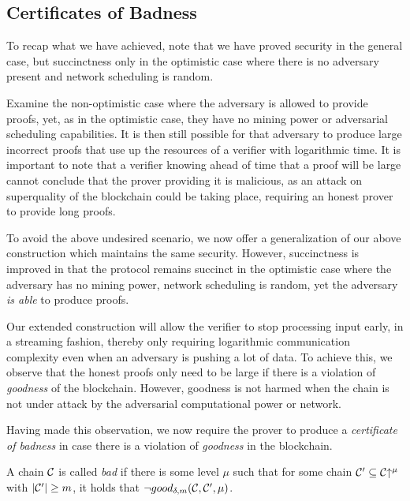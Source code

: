 \subsection{Certificates of Badness}
To recap what we have achieved, note that we have proved security in the general
case, but succinctness only in the optimistic case where there is no adversary
present and network scheduling is random.

Examine the non-optimistic case where the adversary is allowed to provide
proofs, yet, as in the optimistic case, they have no mining power or adversarial
scheduling capabilities. It is then still possible for that adversary to produce
large incorrect proofs that use up the resources of a verifier with logarithmic
time. It is important to note that a verifier knowing ahead of time that a proof
will be large cannot conclude that the prover providing it is malicious, as an
attack on superquality of the blockchain could be taking place, requiring an
honest prover to provide long proofs.

To avoid the above undesired scenario, we now offer a generalization of our
above construction which maintains the same security. However, succinctness is
improved in that the protocol remains succinct in the optimistic case where the
adversary has no mining power, network scheduling is random, yet the adversary
\textit{is able} to produce proofs.

Our extended construction will allow the verifier to stop processing input
early, in a streaming fashion, thereby only requiring logarithmic communication
complexity even when an adversary is pushing a lot of data. To achieve this, we
observe that the honest proofs only need to be large if there is a violation of
\textit{goodness} of the blockchain. However, goodness is not harmed when the
chain is not under attack by the adversarial computational power or network.

Having made this observation, we now require the prover to produce a
\textit{certificate of badness} in case there is a violation of
\textit{goodness} in the blockchain.

\begin{definition}[Badness]
A chain $\mathcal{C}$ is called \textit{bad} if there is some level $\mu$
such that for some chain $\mathcal{C}' \subseteq \mathcal{C}\negthickspace\uparrow^\mu$ with $|\mathcal{C}'| \geq
m$, it holds that $\lnot good_{\delta,m}(\mathcal{C}, \mathcal{C}', \mu)$.
\end{definition}

